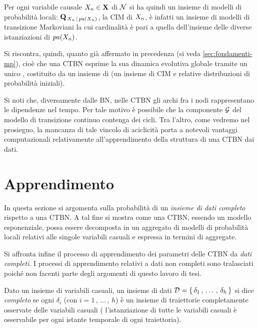 Per ogni variabile causale $\mathnormal{X_n} \in \mathbf{X}$ di $\mathcal{N}$ si ha quindi un insieme di modelli di probabilità locali: $\mathbf{Q}_{\,\mathnormal{X_n}\,\arrowvert\,pa(\mathnormal{X_n})}$, la \acs{CIM} di $\mathnormal{X_n}$, è infatti un insieme di modelli di transizione Markoviani la cui cardinalità è pari a quella dell'insieme delle diverse istanziazioni di $pa(\mathnormal{X_n})$.

Si riscontra, quindi, quanto già affermato in precedenza (si veda \ref{sec:fondamenti-mp}), cioè che una \acs{CTBN} esprime la sua dinamica evolutiva globale tramite un unico \mprocess*{} \omog*{}, costituito da un insieme di \mprocess{} \cond{} (un insieme di \acs{CIM} e relative distribuzioni di probabilità iniziali).

Si noti che, diversamente dalle \acl{BN}, nelle \acl{CTBN} gli archi fra i nodi rappresentano le dipendenze nel tempo. Per tale motivo è possibile che la componente $\mathcal{G}$ del modello di transizione continuo contenga dei cicli. Tra l'altro, come vedremo nel prosieguo, la mancanza di tale vincolo di aciclicità porta a notevoli vantaggi computazionali relativamente all'apprendimento della struttura di una \acs{CTBN} dai dati.

\section{Apprendimento}
\label{sec:ctbn-apprendimento}
In questa sezione si argomenta sulla probabilità di un \emph{insieme di dati completo} rispetto a una \acl{CTBN}. A tal fine si mostra come una \acs{CTBN}, essendo un modello esponenziale, possa essere decomposta in un aggregato di modelli di probabilità locali relativi alle singole variabili casuali e espressa in termini di \emph{\stats{}} aggregate.

Si affronta infine il processo di apprendimento dei parametri delle \acl{CTBN} da \emph{dati completi}. I processi di apprendimento relativi a dati non completi sono tralasciati poiché non facenti parte degli argomenti di questo lavoro di tesi.

\begin{definizione}
\label{defn:dataset-completo}
Dato un insieme di variabili casuali, un insieme di dati $\mathcal{D}=\{\,\delta_1\,,\,\dotsc\,,\,\delta_h\,\}$ si dice \emph{completo} se ogni $\delta_i$ (con $i=1\,,\,\dotsc\,,\,h$) è un insieme di traiettorie completamente osservate delle variabili casuali (\ie{} l'istanziazione di tutte le variabili casuali è osservabile per ogni istante temporale di ogni traiettoria).
\end{definizione}

